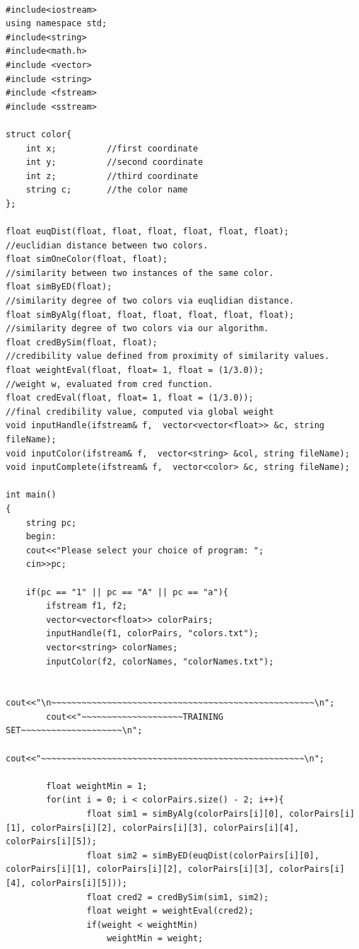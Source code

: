 \documentclass[egilmezThesis.tex]{subfiles}
\begin{document}
\newpage
\lstset{language=C++,basicstyle=\footnotesize}
\begin{lstlisting}[caption=The C++ implementation of the application concerning colors, breaklines=true]

#include<iostream>
using namespace std;
#include<string>
#include<math.h>
#include <vector>
#include <string>
#include <fstream>
#include <sstream>

struct color{
	int x;			//first coordinate
	int y;			//second coordinate
	int z;			//third coordinate
	string c;		//the color name
};

float euqDist(float, float, float, float, float, float);		//euclidian distance between two colors.
float simOneColor(float, float);									//similarity between two instances of the same color.
float simByED(float);												//similarity degree of two colors via euqlidian distance.
float simByAlg(float, float, float, float, float, float);	//similarity degree of two colors via our algorithm.
float credBySim(float, float);									//credibility value defined from proximity of similarity values.
float weightEval(float, float= 1, float = (1/3.0));				//weight w, evaluated from cred function.	
float credEval(float, float= 1, float = (1/3.0));				//final credibility value, computed via global weight
void inputHandle(ifstream& f,  vector<vector<float>> &c, string fileName);
void inputColor(ifstream& f,  vector<string> &col, string fileName);
void inputComplete(ifstream& f,  vector<color> &c, string fileName);

int main()
{
	string pc;
	begin:
	cout<<"Please select your choice of program: ";
	cin>>pc;

	if(pc == "1" || pc == "A" || pc == "a"){
		ifstream f1, f2;
		vector<vector<float>> colorPairs;
		inputHandle(f1, colorPairs, "colors.txt");
		vector<string> colorNames;
		inputColor(f2, colorNames, "colorNames.txt");

		cout<<"\n~~~~~~~~~~~~~~~~~~~~~~~~~~~~~~~~~~~~~~~~~~~~~~~~~~~~\n";
		cout<<"~~~~~~~~~~~~~~~~~~~~TRAINING SET~~~~~~~~~~~~~~~~~~~~\n";
		cout<<"~~~~~~~~~~~~~~~~~~~~~~~~~~~~~~~~~~~~~~~~~~~~~~~~~~~~\n";

		float weightMin = 1;
		for(int i = 0; i < colorPairs.size() - 2; i++){
				float sim1 = simByAlg(colorPairs[i][0], colorPairs[i][1], colorPairs[i][2], colorPairs[i][3], colorPairs[i][4], colorPairs[i][5]);
				float sim2 = simByED(euqDist(colorPairs[i][0], colorPairs[i][1], colorPairs[i][2], colorPairs[i][3], colorPairs[i][4], colorPairs[i][5]));
				float cred2 = credBySim(sim1, sim2);
				float weight = weightEval(cred2);
				if(weight < weightMin)
					weightMin = weight;


\end{lstlisting}
\end{document}
